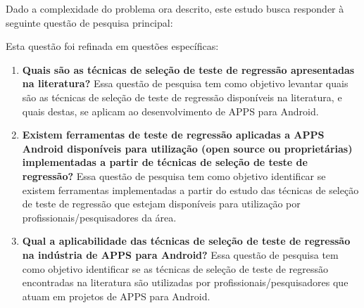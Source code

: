 Dado a complexidade do problema ora descrito, este estudo busca responder à seguinte questão de pesquisa principal:
\begin{center}
    \noindent{}
\end{center}

\vspace{.5em}
Esta questão foi refinada em questões específicas:
\vspace{.5em}

\begin{enumerate}[label=\bf QP\arabic*,leftmargin=1.8cm]

\item \textbf{Quais são as técnicas de seleção de teste de regressão apresentadas na literatura?} Essa questão de pesquisa tem como objetivo levantar quais são as técnicas de seleção de teste de regressão disponíveis na literatura, e quais destas, se aplicam ao desenvolvimento de \ac{APPS} para Android.
    
\item \textbf{Existem ferramentas de teste de regressão aplicadas a \ac{APPS} Android disponíveis para utilização (open source ou proprietárias) implementadas a partir de técnicas de seleção de teste de regressão?} Essa questão de pesquisa tem como objetivo identificar se existem ferramentas implementadas a partir do estudo das técnicas de seleção de teste de regressão que estejam disponíveis para utilização por profissionais/pesquisadores da área.
\item \textbf{Qual a aplicabilidade das técnicas de seleção de teste de regressão na indústria de \ac{APPS} para Android?} Essa questão de pesquisa tem como objetivo identificar se as técnicas de seleção de teste de regressão encontradas na literatura são utilizadas por profissionais/pesquisadores que atuam em projetos de \ac{APPS} para Android.

\end{enumerate}

